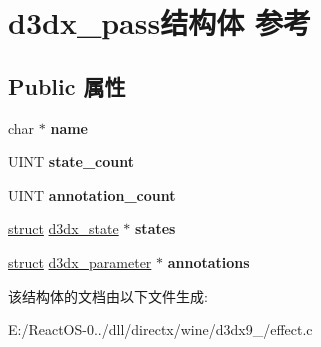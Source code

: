 \hypertarget{structd3dx__pass}{}\section{d3dx\+\_\+pass结构体 参考}
\label{structd3dx__pass}
\subsection*{Public 属性}
\begin{DoxyCompactItemize}
\item 
\mbox{\label{structd3dx__pass_a136f146ee6d110dadafa2bf040e83b9a}} 
char $\ast$ {\bfseries name}
\item 
\mbox{\label{structd3dx__pass_a356ddc038439815febedd53f69a58718}} 
U\+I\+NT {\bfseries state\+\_\+count}
\item 
\mbox{\label{structd3dx__pass_af6dd1405dde82957c6a15504ad0de842}} 
U\+I\+NT {\bfseries annotation\+\_\+count}
\item 
\mbox{\label{structd3dx__pass_a6cd63dde4d43ed64f51d7507f0e3982d}} 
\hyperlink{interfacestruct}{struct} \hyperlink{structd3dx__state}{d3dx\+\_\+state} $\ast$ {\bfseries states}
\item 
\mbox{\label{structd3dx__pass_a05d7d59a52d76e0eeb13fb4c10fe1658}} 
\hyperlink{interfacestruct}{struct} \hyperlink{structd3dx__parameter}{d3dx\+\_\+parameter} $\ast$ {\bfseries annotations}
\end{DoxyCompactItemize}


该结构体的文档由以下文件生成\+:\begin{DoxyCompactItemize}
\item 
E\+:/\+React\+O\+S-\/0../dll/directx/wine/d3dx9\+\_/effect.\+c\end{DoxyCompactItemize}
